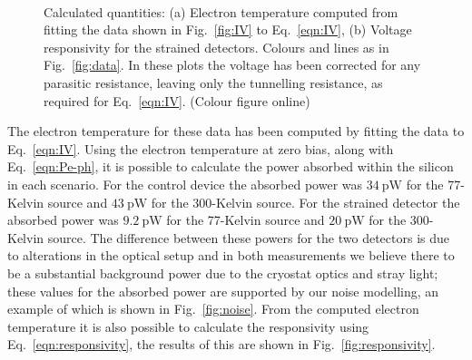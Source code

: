\documentclass[final]{svjour2}
\begin{document}
\par 
\begin{figure}[htb]
\centering
{}\\
\caption{Calculated quantities: (a) Electron temperature computed from fitting the data shown in Fig.~\ref{fig:IV} to Eq.~\ref{eqn:IV}, (b) Voltage responsivity for the strained detectors. Colours and lines as in Fig.~\ref{fig:data}. In these plots the voltage has been corrected for any parasitic resistance, leaving only the tunnelling resistance, as required for Eq.~\ref{eqn:IV}. (Colour figure online)}
\end{figure}
The electron temperature for these data has been computed by fitting the data to Eq.~\ref{eqn:IV}. Using the electron temperature at zero bias, along with Eq.~\ref{eqn:Pe-ph}, it is possible to calculate the power absorbed within the silicon in each scenario. For the control device the absorbed power was $34~\mathrm{pW}$ for the 77-Kelvin source and $43~\mathrm{pW}$ for the 300-Kelvin source. For the strained detector the absorbed power was $9.2~\mathrm{pW}$ for the 77-Kelvin source and $20~\mathrm{pW}$ for the 300-Kelvin source. The difference between these powers for the two detectors is due to alterations in the optical setup and in both measurements we believe there to be a substantial background power due to the cryostat optics and stray light; these values for the absorbed power are supported by our noise modelling, an example of which is shown in Fig.~\ref{fig:noise}. From the computed electron temperature it is also possible to calculate the responsivity using Eq.~\ref{eqn:responsivity}, the results of this are shown in Fig.~\ref{fig:responsivity}.
\end{document}
